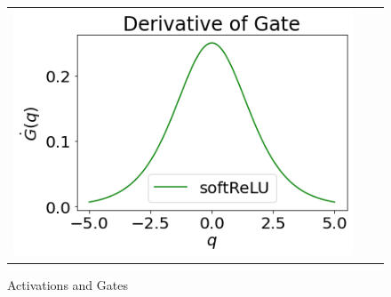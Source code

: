 \begin{figure}[h]
{\begin{tabular}{ccc}
\includegraphics[scale=0.4]{figs/der-gate.png}
\end{tabular}
}
\caption{Activations and Gates}
\label{fig:actgate}
\end{figure}
